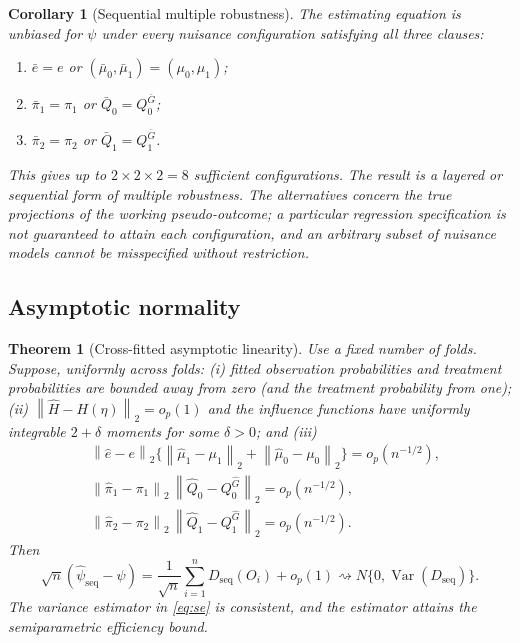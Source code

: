 \documentclass[11pt]{article}
\newtheorem{theorem}{Theorem}
\newtheorem{corollary}{Corollary}
\theoremstyle{definition}
\newcommand{\Var}{\operatorname{Var}}
\newcommand{\norm}[1]{\left\lVert #1\right\rVert_2}
\newcommand{\1}{\mathbf{1}}
\newcommand{\seq}{\mathrm{seq}}
\begin{document}
\begin{corollary}[Sequential multiple robustness]\label{cor:robustness}
The estimating equation is unbiased for $\psi$ under every nuisance configuration satisfying all three clauses:
\begin{enumerate}[label=(\roman*),leftmargin=*]
\item $\bar e=e$ or $(\bar\mu_0,\bar\mu_1)=(\mu_0,\mu_1)$;
\item $\bar\pi_1=\pi_1$ or $\bar Q_0=Q_0^{\bar G}$;
\item $\bar\pi_2=\pi_2$ or $\bar Q_1=Q_1^{\bar G}$.
\end{enumerate}
This gives up to $2\times2\times2=8$ sufficient configurations. The result is a layered or sequential form of multiple robustness. The alternatives concern the true projections of the working pseudo-outcome; a particular regression specification is not guaranteed to attain each configuration, and an arbitrary subset of nuisance models cannot be misspecified without restriction.
\end{corollary}

\subsection{Asymptotic normality}

\begin{theorem}[Cross-fitted asymptotic linearity]\label{thm:asymptotics}
Use a fixed number of folds. Suppose, uniformly across folds: (i) fitted observation probabilities and treatment probabilities are bounded away from zero (and the treatment probability from one); (ii) $\norm{\widehat H-H(\eta)}=o_p(1)$ and the influence functions have uniformly integrable $2+\delta$ moments for some $\delta>0$; and (iii)
\begin{align*}
&\norm{\widehat e-e}
\{\norm{\widehat\mu_1-\mu_1}+\norm{\widehat\mu_0-\mu_0}\}
=o_p(n^{-1/2}),\\
&\norm{\widehat\pi_1-\pi_1}\,
\norm{\widehat Q_0-Q_0^{\widehat G}}=o_p(n^{-1/2}),\\
&\norm{\widehat\pi_2-\pi_2}\,
\norm{\widehat Q_1-Q_1^{\widehat G}}=o_p(n^{-1/2}).
\end{align*}
Then
\[
\sqrt n(\widehat\psi_{\seq}-\psi)
=\frac{1}{\sqrt n}\sum_{i=1}^nD_{\seq}(O_i)+o_p(1)
\rightsquigarrow N\{0,\Var(D_{\seq})\}.
\]
The variance estimator in \cref{eq:se} is consistent, and the estimator attains the semiparametric efficiency bound.
\end{theorem}
\end{document}
